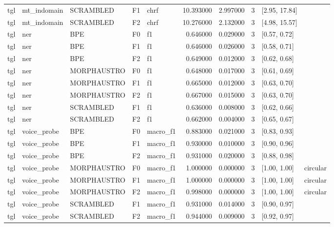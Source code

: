 \begin{table}
\begin{tabular}{lllllrrrll}
tgl & mt\_indomain & SCRAMBLED & F1 & chrf & 10.393000 & 2.997000 & 3 & [2.95, 17.84] &  \\
tgl & mt\_indomain & SCRAMBLED & F2 & chrf & 10.276000 & 2.132000 & 3 & [4.98, 15.57] &  \\
tgl & ner & BPE & F0 & f1 & 0.646000 & 0.029000 & 3 & [0.57, 0.72] &  \\
tgl & ner & BPE & F1 & f1 & 0.646000 & 0.026000 & 3 & [0.58, 0.71] &  \\
tgl & ner & BPE & F2 & f1 & 0.649000 & 0.012000 & 3 & [0.62, 0.68] &  \\
tgl & ner & MORPHAUSTRO & F0 & f1 & 0.648000 & 0.017000 & 3 & [0.61, 0.69] &  \\
tgl & ner & MORPHAUSTRO & F1 & f1 & 0.665000 & 0.012000 & 3 & [0.63, 0.70] &  \\
tgl & ner & MORPHAUSTRO & F2 & f1 & 0.667000 & 0.015000 & 3 & [0.63, 0.70] &  \\
tgl & ner & SCRAMBLED & F1 & f1 & 0.636000 & 0.008000 & 3 & [0.62, 0.66] &  \\
tgl & ner & SCRAMBLED & F2 & f1 & 0.662000 & 0.004000 & 3 & [0.65, 0.67] &  \\
tgl & voice\_probe & BPE & F0 & macro\_f1 & 0.883000 & 0.021000 & 3 & [0.83, 0.93] &  \\
tgl & voice\_probe & BPE & F1 & macro\_f1 & 0.930000 & 0.010000 & 3 & [0.90, 0.96] &  \\
tgl & voice\_probe & BPE & F2 & macro\_f1 & 0.931000 & 0.020000 & 3 & [0.88, 0.98] &  \\
tgl & voice\_probe & MORPHAUSTRO & F0 & macro\_f1 & 1.000000 & 0.000000 & 3 & [1.00, 1.00] & circular \\
tgl & voice\_probe & MORPHAUSTRO & F1 & macro\_f1 & 1.000000 & 0.000000 & 3 & [1.00, 1.00] & circular \\
tgl & voice\_probe & MORPHAUSTRO & F2 & macro\_f1 & 0.998000 & 0.000000 & 3 & [1.00, 1.00] & circular \\
tgl & voice\_probe & SCRAMBLED & F1 & macro\_f1 & 0.931000 & 0.014000 & 3 & [0.90, 0.97] &  \\
tgl & voice\_probe & SCRAMBLED & F2 & macro\_f1 & 0.944000 & 0.009000 & 3 & [0.92, 0.97] &  \\
\bottomrule
\end{tabular}
\end{table}



